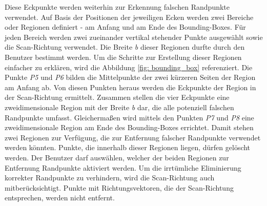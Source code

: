 Diese Eckpunkte werden weiterhin zur Erkennung falschen Randpunkte verwendet. Auf Basis der Positionen der jeweiligen Ecken werden zwei Bereiche oder Regionen definiert - am Anfang und am Ende des Bounding-Boxes. Für jeden Bereich werden zwei zueinander vertikal stehender Punkte ausgewählt sowie die Scan-Richtung verwendet. Die Breite \textit{b} dieser Regionen durfte durch den Benutzer bestimmt werden. Um die Schritte zur Erstellung dieser Regionen einfacher zu erklären, wird die Abbildung \ref{fig: bounding_box} referenziert. Die Punkte \textit{P5} und \textit{P6} bilden die Mittelpunkte der zwei kürzeren Seiten der Region am Anfang ab. Von diesen Punkten heraus werden die Eckpunkte der Region in der Scan-Richtung ermittelt. Zusammen stellen die vier Eckpunkte eine zweidimensionale Region mit der Breite \textit{b} dar, die alle potenziell falschen Randpunkte umfasst. Gleichermaßen wird mittels den Punkten \textit{P7} und \textit{P8} eine zweidimensionale Region am Ende des Bounding-Boxes errichtet. Damit stehen zwei Regionen zur Verfügung, die zur Entfernung falscher Randpunkte verwendet werden könnten. Punkte, die innerhalb dieser Regionen liegen, dürfen gelöscht werden. Der Benutzer darf auswählen, welcher der beiden Regionen zur Entfernung Randpunkte aktiviert werden. Um die irrtümliche Eliminierung korrekter Randpunkte zu verhindern, wird die Scan-Richtung auch mitberücksichtigt. Punkte mit Richtungsvektoren, die der Scan-Richtung entsprechen, werden nicht entfernt. 


